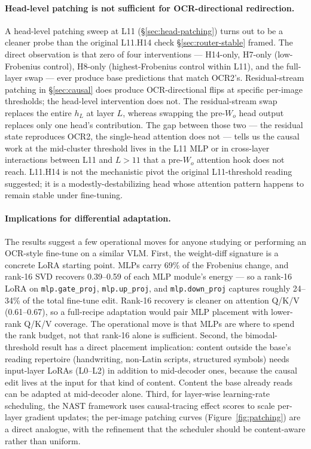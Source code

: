 \documentclass[10pt,twocolumn,letterpaper]{article}
\begin{document}
\paragraph{Head-level patching is not sufficient for OCR-directional redirection.} A head-level patching sweep at L11 (\S\ref{sec:head-patching}) turns out to be a cleaner probe than the original L11.H14 check \S\ref{sec:router-stable} framed. The direct observation is that zero of four interventions --- H14-only, H7-only (low-Frobenius control), H8-only (highest-Frobenius control within L11), and the full-layer swap --- ever produce base predictions that match OCR2's. Residual-stream patching in \S\ref{sec:causal} does produce OCR-directional flips at specific per-image thresholds; the head-level intervention does not. The residual-stream swap replaces the entire $h_L$ at layer $L$, whereas swapping the pre-$W_o$ head output replaces only one head's contribution. The gap between those two --- the residual state reproduces OCR2, the single-head attention does not --- tells us the causal work at the mid-cluster threshold lives in the L11 MLP or in cross-layer interactions between L11 and $L > 11$ that a pre-$W_o$ attention hook does not reach. L11.H14 is not the mechanistic pivot the original L11-threshold reading suggested; it is a modestly-destabilizing head whose attention pattern happens to remain stable under fine-tuning.

\paragraph{Implications for differential adaptation.} The results suggest a few operational moves for anyone studying or performing an OCR-style fine-tune on a similar VLM. First, the weight-diff signature is a concrete LoRA starting point. MLPs carry 69\% of the Frobenius change, and rank-16 SVD recovers 0.39--0.59 of each MLP module's energy --- so a rank-16 LoRA on \texttt{mlp.gate\_proj}, \texttt{mlp.up\_proj}, and \texttt{mlp.down\_proj} captures roughly 24--34\% of the total fine-tune edit. Rank-16 recovery is cleaner on attention Q/K/V (0.61--0.67), so a full-recipe adaptation would pair MLP placement with lower-rank Q/K/V coverage. The operational move is that MLPs are where to spend the rank budget, not that rank-16 alone is sufficient. Second, the bimodal-threshold result has a direct placement implication: content outside the base's reading repertoire (handwriting, non-Latin scripts, structured symbols) needs input-layer LoRAs (L0--L2) in addition to mid-decoder ones, because the causal edit lives at the input for that kind of content. Content the base already reads can be adapted at mid-decoder alone. Third, for layer-wise learning-rate scheduling, the NAST framework \citep{sim2026layerspecific} uses causal-tracing effect scores to scale per-layer gradient updates; the per-image patching curves (Figure~\ref{fig:patching}) are a direct analogue, with the refinement that the scheduler should be content-aware rather than uniform.
\end{document}
